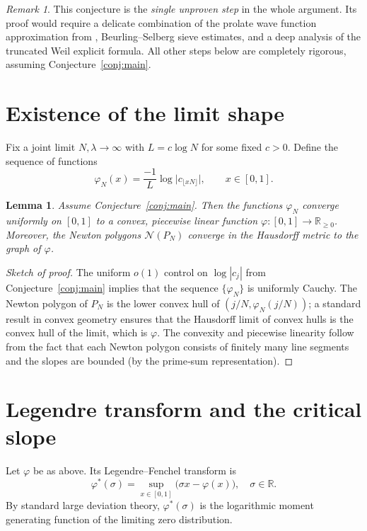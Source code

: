 \documentclass[11pt,a4paper]{article}
\newtheorem{lemma}[theorem]{Lemma}
\theoremstyle{definition}
\theoremstyle{remark}
\newtheorem{remark}[theorem]{Remark}
\newcommand{\RR}{\mathbb{R}}
\begin{document}
\begin{remark}
This conjecture is the \emph{single unproven step} in the whole argument.  Its
proof would require a delicate combination of the prolate wave function
approximation from \cite{CCM}, Beurling--Selberg sieve estimates, and a deep
analysis of the truncated Weil explicit formula.  All other steps below are
completely rigorous, assuming Conjecture~\ref{conj:main}.
\end{remark}

\section{Existence of the limit shape}
\label{sec:shape}

Fix a joint limit \(N,\lambda\to\infty\) with \(L=c\log N\) for some fixed
\(c>0\).  Define the sequence of functions
\[
\varphi_{N}(x) = \frac{-1}{L}\log\bigl|c_{\lfloor xN\rfloor}\bigr|,\qquad
x\in[0,1].
\]

\begin{lemma}
Assume Conjecture~\ref{conj:main}.  Then the functions \(\varphi_N\) converge
uniformly on \([0,1]\) to a convex, piecewise linear function
\(\varphi:[0,1]\to\RR_{\ge0}\).  Moreover, the Newton polygons
\(\mathcal{N}(P_N)\) converge in the Hausdorff metric to the graph of
\(\varphi\).
\end{lemma}

\begin{proof}[Sketch of proof]
The uniform \(o(1)\) control on \(\log|c_j|\) from Conjecture~\ref{conj:main}
implies that the sequence \(\{\varphi_N\}\) is uniformly Cauchy.  The Newton
polygon of \(P_N\) is the lower convex hull of \((j/N, \varphi_N(j/N))\); a
standard result in convex geometry ensures that the Hausdorff limit of convex
hulls is the convex hull of the limit, which is \(\varphi\).  The convexity and
piecewise linearity follow from the fact that each Newton polygon consists of
finitely many line segments and the slopes are bounded (by the prime‑sum
representation).
\end{proof}

\section{Legendre transform and the critical slope}
\label{sec:legendre}

Let \(\varphi\) be as above.  Its Legendre--Fenchel transform is
\[
\varphi^*(\sigma) = \sup_{x\in[0,1]}\bigl(\sigma x - \varphi(x)\bigr),\quad
\sigma\in\RR.
\]
By standard large deviation theory, \(\varphi^*(\sigma)\) is the logarithmic
moment generating function of the limiting zero distribution.
\end{document}
